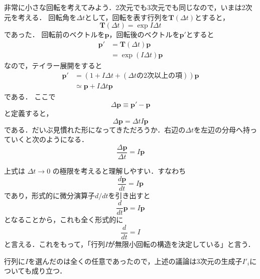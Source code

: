 \documentclass{jsbook}
\newcommand{\bvec}[1]{\boldsymbol{#1}}
\newcommand{\bop}[1]{\boldsymbol{#1}}
\newcommand{\verysmall}{\varDelta}
\begin{document}
非常に小さな回転を考えてみよう．2次元でも3次元でも同じなので，いまは2次元を考える．
回転角を$\verysmall t$として，回転を表す行列を$\bop{T}(\verysmall t)$とすると，
\begin{equation}
\bop{T}(\verysmall t)=\exp I\verysmall t
\end{equation}
であった．
回転前のベクトルを$\bvec{p}$，回転後のベクトルを$\bvec{p}'$とすると
\begin{align}
\bvec{p}'&=\bop{T}(\verysmall t)\bvec{p}\\
  &=\exp(I\verysmall t)\bvec{p}
\end{align}
なので，テイラー展開をすると
\begin{align}
\bvec{p}'&=(1+I\verysmall t+(\text{$\verysmall t$の2次以上の項}))\bvec{p}\\
  &\simeq\bvec{p}+I\verysmall t\bvec{p}
\end{align}
である．
ここで
\begin{equation}
\verysmall\bvec{p}\equiv\bvec{p}'-\bvec{p}
\end{equation}
と定義すると，
\begin{equation}
\verysmall\bvec{p}=\verysmall tI\bvec{p}
\end{equation}
である．だいぶ見慣れた形になってきただろうか．右辺の$\verysmall t$を左辺の分母へ持っていくと次のようになる．
\begin{equation}
\frac{\verysmall\bvec{p}}{\verysmall t}=I\bvec{p}
\end{equation}

上式は $\verysmall t\rightarrow0$ の極限を考えると理解しやすい．すなわち
\begin{equation}
\frac{d\bvec{p}}{dt}=I\bvec{p}
\end{equation}
であり，形式的に微分演算子$d/dt$を引き出すと
\begin{equation}
\frac{d}{dt}\bvec{p}=I\bvec{p}
\end{equation}
となることから，これも全く形式的に
\begin{equation}
\frac{d}{dt}=I
\end{equation}
と言える．これをもって，「行列$I$が無限小回転の構造を決定している」と言う．

行列に$I$を選んだのは全くの任意であったので，上述の議論は3次元の生成子$I'_i$についても成り立つ．
\end{document}

